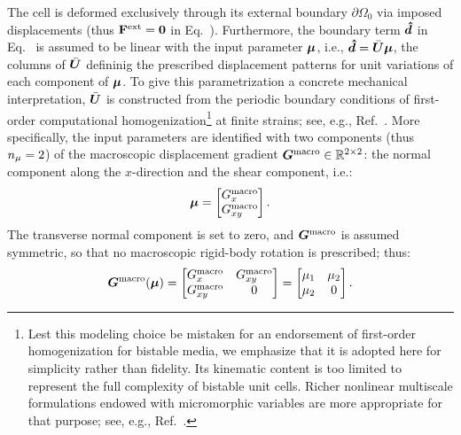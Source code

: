 \documentclass[preprint,10pt]{elsarticle}  %
\begin{document}
The cell is deformed    exclusively through its external boundary $\partial \Omega_0$ via imposed displacements (thus
\(\mathbf{F}^{\mathrm{ext}}=\boldsymbol{0}\) in Eq.~). Furthermore, the boundary term $\bm{\hat{d}}$ in Eq.~ is assumed to be linear with the input parameter $\bm{\mu}$, i.e., $\bm{\hat{d}}=\bar{\bm{U}}\bm{\mu}$,
  the columns of $\bar{\bm{U}}$ defininig the prescribed displacement patterns for unit variations of each component of $\bm{\mu}$. To give this   parametrization a concrete mechanical
interpretation, \(\bar{\bm{U}}\) is constructed from the periodic boundary
conditions of first-order computational homogenization\footnote{Lest this modeling choice be mistaken for an endorsement of
first-order homogenization for bistable media, we emphasize that it is
adopted here for simplicity rather than fidelity. Its kinematic content
is too limited to represent the full complexity of bistable
unit cells. Richer nonlinear multiscale formulations endowed with
micromorphic variables are more appropriate for that purpose; see,
e.g., Ref.~\cite{sperling2024comparative}.} at finite
strains; see, e.g., Ref.~\cite{miehe2003computational}. %
  More specifically, the input parameters are identified with two   components (thus $n_{\mu} = 2$) of the macroscopic displacement gradient $\bm{G}^{\mathrm{macro}} \in \mathbb{R}^{2 \times 2}$:  the normal
component along the \(x\)-direction and the shear component, i.e.:
\begin{equation}
\label{eq:meta_macro_gradient}
    \bm{\mu}
    =
    \begin{bmatrix}
        {G}^{\mathrm{macro}}_x\\
        {G}^{\mathrm{macro}}_{xy}
    \end{bmatrix}.
\end{equation}
The transverse normal component is set to zero, and \(\bm{G}^{\mathrm{macro}}\) is assumed
symmetric, so that no macroscopic rigid-body rotation is prescribed; thus:
\begin{equation}
    \bm{G}^{\mathrm{macro}}(\bm{\mu})
    =
    \begin{bmatrix}
        {G}^{\mathrm{macro}}_x  & {G}^{\mathrm{macro}}_{xy}\\
        {G}^{\mathrm{macro}}_{xy} & 0
    \end{bmatrix} =\begin{bmatrix}
        \mu_1  & \mu_2\\
        \mu_2 & 0
    \end{bmatrix}.
\end{equation}
\end{document}
